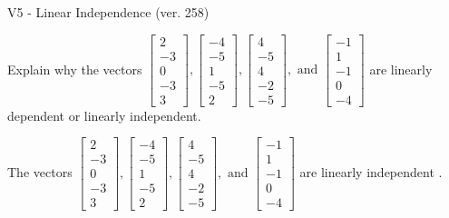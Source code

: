 \begin{exercise}
  \begin{exerciseTitle}V5 - Linear Independence (ver. 258)\end{exerciseTitle}
  \begin{exerciseStatement}
    Explain why the vectors \(\left[\begin{array}{r}
2 \\
-3 \\
0 \\
-3 \\
3
\end{array}\right] , \left[\begin{array}{r}
-4 \\
-5 \\
1 \\
-5 \\
2
\end{array}\right] , \left[\begin{array}{r}
4 \\
-5 \\
4 \\
-2 \\
-5
\end{array}\right] , \text{ and } \left[\begin{array}{r}
-1 \\
1 \\
-1 \\
0 \\
-4
\end{array}\right]\) are linearly dependent or linearly independent.	


  \end{exerciseStatement}
  \begin{exerciseAnswer}
   The vectors \(\left[\begin{array}{r}
2 \\
-3 \\
0 \\
-3 \\
3
\end{array}\right] , \left[\begin{array}{r}
-4 \\
-5 \\
1 \\
-5 \\
2
\end{array}\right] , \left[\begin{array}{r}
4 \\
-5 \\
4 \\
-2 \\
-5
\end{array}\right] , \text{ and } \left[\begin{array}{r}
-1 \\
1 \\
-1 \\
0 \\
-4
\end{array}\right]\) are 
  	 linearly independent  .
  


  \end{exerciseAnswer}
\end{exercise}